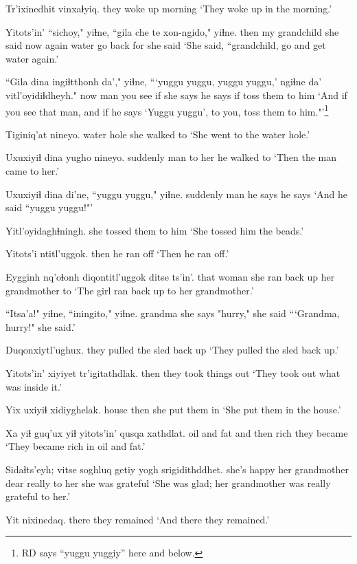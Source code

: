 \documentclass[12pt]{article}
\begin{document}
\gll Tr'ixinedhit vinxaɬyiq.
{they woke up} morning
\glt `They woke up in the morning.'
\glend

\gll Yitots'in' ``sichoy," yiɬne, ``gila che te xon-ngido," yiɬne.
then {my grandchild} {she said} now again water {go back for} {she said}
\glt `She said, ``grandchild, go and get water again.'
\glend

\gll ``Gila dina ingiɬtthonh da'," yiɬne, {```yuggu yuggu, yuggu yuggu,'} ngiɬne da' vitl'oyidiɬdheyh."
now man {you see} if {she says} {} {he says} if {toss them to him}
\glt `And if you see that man, and if he says `Yuggu yuggu', to you, toss them to him."'\footnote{RD says ``yuggu yuggiy'' here and below.}
\glend

\gll Tiginiq'at nineyo.
{water hole} {she walked to}
\glt `She went to the water hole.'
\glend

\gll Uxuxiyiɬ dina yugho nineyo.
suddenly man {to her} {he walked to}
\glt `Then the man came to her.'
\glend

\gll Uxuxiyiɬ dina di'ne, {``yuggu yuggu,"} yiɬne.
suddenly man {he says} {} he says
\glt `And he said ``yuggu yuggu!"'
\glend

\gll Yitl'oyidaghɬningh.
{{she tossed them to him}}
\glt `She tossed him the beads.'
\glend

\gll Yitots'i ntitl'uggok.
then {he ran off}
\glt `Then he ran off.'
\glend

\gll Eygginh nq'oɬonh diqontitl'uggok ditse ts'in'.
that woman {she ran back up} {her grandmother} to
\glt `The girl ran back up to her grandmother.'
\glend

\gll ``Itsa'a!" yiɬne, ``iningito," yiɬne.
grandma {she says} "hurry," she said
\glt ```Grandma, hurry!" she said.'
\glend

\gll Duqonxiytl'ughux.
{{they pulled the sled back up}}
\glt `They pulled the sled back up.'
\glend

\gll Yitots'in' {xiyiyet tr'igitathdlak.}
then {they took things out}
\glt `They took out what was inside it.'
\glend

\gll Yix uxiyiɬ xidiyghelak.
house then {she put them in}
\glt `She put them in the house.'
\glend

\gll Xa yiɬ guq'ux yiɬ yitots'in' qusqa xathdlat.
oil and fat and then rich {they became}
\glt `They became rich in oil and fat.'
\glend

\gll Sidaɬts'eyh; vitse soghluq getiy yogh srigidithddhet.
{she's happy} {her grandmother} dear really {to her} {she was grateful}
\glt `She was glad; her grandmother was really grateful to her.'
\glend

\gll Yit nixinedaq.
there {they remained}
\glt `And there they remained.'
\glend
\end{document}
